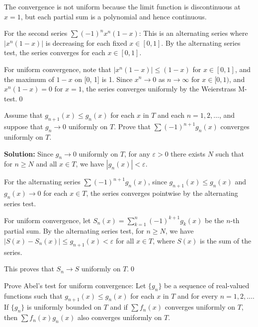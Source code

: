 The convergence is not uniform because the limit function is discontinuous at \( x = 1 \), but each partial sum is a polynomial and hence continuous.

For the second series \( \sum (-1)^n x^n (1 - x) \): This is an alternating series where \( |x^n (1 - x)| \) is decreasing for each fixed \( x \in [0, 1] \). By the alternating series test, the series converges for each \( x \in [0, 1] \).

For uniform convergence, note that \( |x^n (1 - x)| \leq (1 - x) \) for \( x \in [0, 1] \), and the maximum of \( 1 - x \) on [0, 1] is 1. Since \( x^n \to 0 \) as \( n \to \infty \) for \( x \in [0, 1) \), and \( x^n (1 - x) = 0 \) for \( x = 1 \), the series converges uniformly by the Weierstrass M-test.\qed


\begin{problembox}
Assume that \( g_{n+1}(x) \leq g_n(x) \) for each \( x \) in \( T \) and each \( n = 1, 2, \ldots \), and suppose that \( g_n \to 0 \) uniformly on \( T \). Prove that \( \sum (-1)^{n+1} g_n(x) \) converges uniformly on \( T \).
\end{problembox}

\bigskip\noindent\textbf{Solution:} Since \( g_n \to 0 \) uniformly on \( T \), for any \( \varepsilon > 0 \) there exists \( N \) such that for \( n \geq N \) and all \( x \in T \), we have \( |g_n(x)| < \varepsilon \).

For the alternating series \( \sum (-1)^{n+1} g_n(x) \), since \( g_{n+1}(x) \leq g_n(x) \) and \( g_n(x) \to 0 \) for each \( x \in T \), the series converges pointwise by the alternating series test.

For uniform convergence, let \( S_n(x) = \sum_{k=1}^n (-1)^{k+1} g_k(x) \) be the \( n \)-th partial sum. By the alternating series test, for \( n \geq N \), we have \( |S(x) - S_n(x)| \leq g_{n+1}(x) < \varepsilon \) for all \( x \in T \), where \( S(x) \) is the sum of the series.

This proves that \( S_n \to S \) uniformly on \( T \).\qed




\begin{problembox}
Prove Abel's test for uniform convergence: Let \( \{g_n\} \) be a sequence of real-valued functions such that \( g_{n+1}(x) \leq g_n(x) \) for each \( x \) in \( T \) and for every \( n = 1, 2, \ldots \). If \( \{g_n\} \) is uniformly bounded on \( T \) and if \(\sum f_n(x)\) converges uniformly on \( T \), then \(\sum f_n(x)g_n(x)\) also converges uniformly on \( T \).
\end{problembox}

